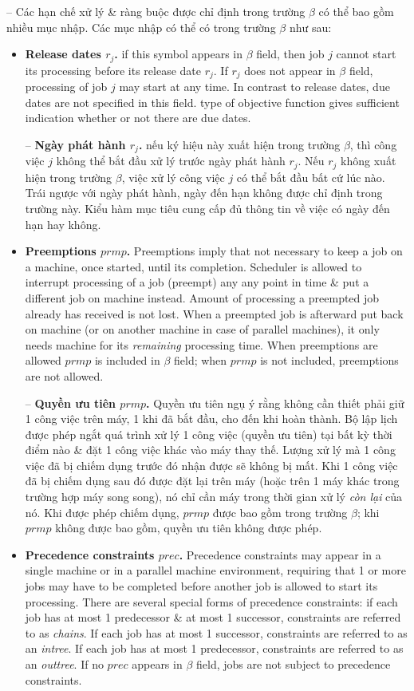 \documentclass{article}
\begin{document}
\begin{itemize}
\begin{itemize}
        -- Các hạn chế xử lý \& ràng buộc được chỉ định trong trường $\beta$ có thể bao gồm nhiều mục nhập. Các mục nhập có thể có trong trường $\beta$ như sau:
        \begin{itemize}
            \item {\bf Release dates $r_j$.} if this symbol appears in $\beta$ field, then job $j$ cannot start its processing before its release date $r_j$. If $r_j$ does not appear in $\beta$ field, processing of job $j$ may start at any time. In contrast to release dates, due dates are not specified in this field. type of objective function gives sufficient indication whether or not there are due dates.

            -- {\bf Ngày phát hành $r_j$.} nếu ký hiệu này xuất hiện trong trường $\beta$, thì công việc $j$ không thể bắt đầu xử lý trước ngày phát hành $r_j$. Nếu $r_j$ không xuất hiện trong trường $\beta$, việc xử lý công việc $j$ có thể bắt đầu bất cứ lúc nào. Trái ngược với ngày phát hành, ngày đến hạn không được chỉ định trong trường này. Kiểu hàm mục tiêu cung cấp đủ thông tin về việc có ngày đến hạn hay không.
            \item {\bf Preemptions $prmp$.} Preemptions imply that not necessary to keep a job on a machine, once started, until its completion. Scheduler is allowed to interrupt processing of a job (preempt) any any point in time \& put a different job on machine instead. Amount of processing a preempted job already has received is not lost. When a preempted job is afterward put back on machine (or on another machine in case of parallel machines), it only needs machine for its {\it remaining} processing time. When preemptions are allowed $prmp$ is included in $\beta$ field; when $prmp$ is not included, preemptions are not allowed.

            -- {\bf Quyền ưu tiên $prmp$.} Quyền ưu tiên ngụ ý rằng không cần thiết phải giữ 1 công việc trên máy, 1 khi đã bắt đầu, cho đến khi hoàn thành. Bộ lập lịch được phép ngắt quá trình xử lý 1 công việc (quyền ưu tiên) tại bất kỳ thời điểm nào \& đặt 1 công việc khác vào máy thay thế. Lượng xử lý mà 1 công việc đã bị chiếm dụng trước đó nhận được sẽ không bị mất. Khi 1 công việc đã bị chiếm dụng sau đó được đặt lại trên máy (hoặc trên 1 máy khác trong trường hợp máy song song), nó chỉ cần máy trong thời gian xử lý {\it còn lại} của nó. Khi được phép chiếm dụng, $prmp$ được bao gồm trong trường $\beta$; khi $prmp$ không được bao gồm, quyền ưu tiên không được phép.
            \item {\bf Precedence constraints $prec$.} Precedence constraints may appear in a single machine or in a parallel machine environment, requiring that 1 or more jobs may have to be completed before another job is allowed to start its processing. There are several special forms of precedence constraints: if each job has at most 1 predecessor \& at most 1 successor, constraints are referred to as {\it chains}. If each job has at most 1 successor, constraints are referred to as an {\it intree}. If each job has at most 1 predecessor, constraints are referred to as an {\it outtree}. If no $prec$ appears in $\beta$ field, jobs are not subject to precedence constraints.


\end{itemize}
\end{itemize}
\end{itemize}
\end{document}

